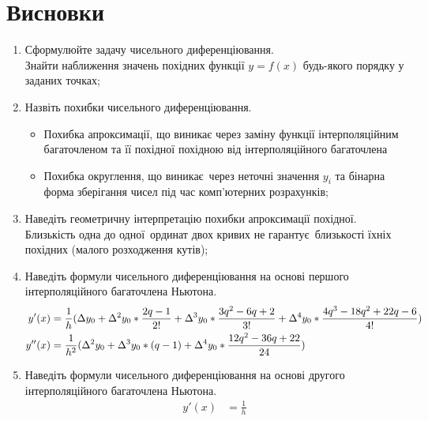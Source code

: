 \section{Висновки}
\label{seq:summary}

\begin{enumerate}
    \item Сформулюйте задачу чисельного диференціювання. \\
          Знайти наближення значень похідних функції $y = f(x)$
          будь-якого порядку у заданих точках;
    \item Назвіть похибки чисельного диференціювання.
          \begin{itemize}
              \item Похибка апроксимації, що виникає через заміну функції
                    інтерполяційним багаточленом та її похідної похідною
                    від інтерполяційного багаточлена
              \item Похибка округлення, що виникає через неточні значення $y_i$
                    та бінарна форма зберігання чисел під час комп'ютерних розрахунків;
          \end{itemize}
    \item Наведіть геометричну інтерпретацію похибки апроксимації похідної. \\
          Близькість одна до одної ординат двох кривих не гарантує близькості
          їхніх похідних (малого розходження кутів);
    \item Наведіть формули чисельного диференціювання
          на основі першого інтерполяційного багаточлена Ньютона.
          \begin{align}
              y'(x)  & = \frac{1}{h}
              ( \Delta                     y_0
              + \Delta \textsuperscript{2} y_0 * \frac{2q - 1}{2!}
              + \Delta \textsuperscript{3} y_0 * \frac{3q^2 - 6q + 2}{3!}
              + \Delta \textsuperscript{4} y_0 * \frac{4q^3 - 18q^2 + 22q - 6}{4!} ) \\
              y''(x) & = \frac{1}{h^2}
              ( \Delta \textsuperscript{2} y_0
              + \Delta \textsuperscript{3} y_0 * (q - 1)
              + \Delta \textsuperscript{4} y_0 * \frac{12q^2 - 36q + 22}{24} )
          \end{align}
    \item Наведіть формули чисельного диференціювання
          на основі другого інтерполяційного багаточлена Ньютона.
          \begin{align}
              y'(x)  & = \frac{1}{h}

\end{align}
\end{enumerate}
